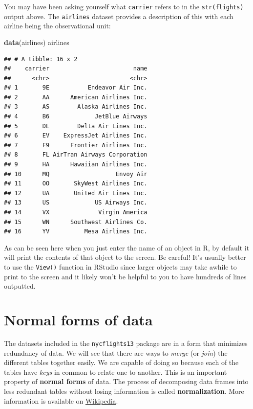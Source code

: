 \documentclass[]{tufte-book}
\newenvironment{Shaded}{\begin{snugshade}}{\end{snugshade}}
\newcommand{\KeywordTok}[1]{\textcolor[rgb]{0.13,0.29,0.53}{\textbf{{#1}}}}
\newcommand{\NormalTok}[1]{{#1}}
\begin{document}
You may have been asking yourself what \texttt{carrier} refers to in the
\texttt{str(flights)} output above. The \texttt{airlines} dataset
provides a description of this with each airline being the observational
unit:

\begin{Shaded}
\begin{Highlighting}[]
\KeywordTok{data}\NormalTok{(airlines)}
\NormalTok{airlines}
\end{Highlighting}
\end{Shaded}

\begin{verbatim}
## # A tibble: 16 x 2
##    carrier                        name
##      <chr>                       <chr>
## 1       9E           Endeavor Air Inc.
## 2       AA      American Airlines Inc.
## 3       AS        Alaska Airlines Inc.
## 4       B6             JetBlue Airways
## 5       DL        Delta Air Lines Inc.
## 6       EV    ExpressJet Airlines Inc.
## 7       F9      Frontier Airlines Inc.
## 8       FL AirTran Airways Corporation
## 9       HA      Hawaiian Airlines Inc.
## 10      MQ                   Envoy Air
## 11      OO       SkyWest Airlines Inc.
## 12      UA       United Air Lines Inc.
## 13      US             US Airways Inc.
## 14      VX              Virgin America
## 15      WN      Southwest Airlines Co.
## 16      YV          Mesa Airlines Inc.
\end{verbatim}

As can be seen here when you just enter the name of an object in R, by
default it will print the contents of that object to the screen. Be
careful! It's usually better to use the \texttt{View()} function in
RStudio since larger objects may take awhile to print to the screen and
it likely won't be helpful to you to have hundreds of lines outputted.

\section{Normal forms of data}\label{normal-forms-of-data}

The datasets included in the \texttt{nycflights13} package are in a form
that minimizes redundancy of data. We will see that there are ways to
\emph{merge} (or \emph{join}) the different tables together easily. We
are capable of doing so because each of the tables have \emph{keys} in
common to relate one to another. This is an important property of
\textbf{normal forms} of data. The process of decomposing data frames
into less redundant tables without losing information is called
\textbf{normalization}. More information is available on
\href{https://en.wikipedia.org/wiki/Database_normalization}{Wikipedia}.
\end{document}
